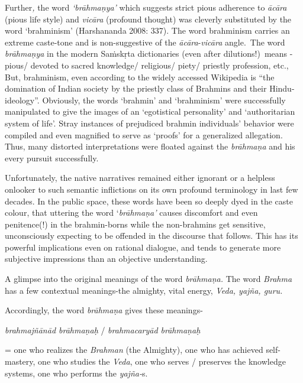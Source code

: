 Further\textit{,} the word\textit{ ‘brāhmaṇya’} which suggests strict pious adherence to \textit{ācāra} (pious life style) and \textit{vicāra} (profound thought) was cleverly substituted by the word ‘brahminism’ (Harshananda 2008: 337). The word brahminism carries an extreme caste-tone and is non-suggestive of the \textit{ācāra}-\textit{vicāra} angle.~The word \textit{brāhmaṇya} in the modern Saṁskṛta dictionaries (even after dilutions!)~means - pious/ devoted to sacred knowledge/ religious/ piety/ priestly profession, etc., But, brahminism, even according to the widely accessed Wikipedia is “the domination of Indian society by the priestly class of Brahmins and their Hindu-ideology”. Obviously, the words ‘brahmin’ and ‘brahminism’ were successfully manipulated to give the images of an ‘egotistical personality’ and ‘authoritarian system of life’. Stray instances of prejudiced brahmin individuals’ behavior were compiled and even magnified to serve as ‘proofs’ for a generalized allegation. Thus, many distorted interpretations were floated against the \textit{brāhmaṇa} and his every pursuit successfully.

Unfortunately, the native narratives remained either ignorant or a helpless onlooker to such semantic inflictions on its own profound terminology in last few decades. In the public space, these words have been so deeply dyed in the caste colour, that uttering the word ‘\textit{brāhmaṇa’} causes discomfort and even penitence(!) in the brahmin-borns while the non-brahmins get sensitive, unconsciously expecting to be offended in the discourse that follows. This has its powerful implications even on rational dialogue, and tends to generate more subjective impressions than an objective understanding.

A glimpse into the original meanings of the word \textit{brāhmaṇa.} The word \textit{Brahma} has a few contextual meanings-the almighty, vital energy, \textit{Veda, yajña, guru.}

Accordingly, the word \textit{brāhmaṇa} gives these meanings-

\textit{brahmajñānād brāhmaṇaḥ} / \textit{brahmacaryād brāhmaṇaḥ}

= one who realizes the \textit{Brahman} (the Almighty), one who has achieved self-mastery, one who studies the \textit{Veda}, one who serves / preserves the knowledge systems, one who performs the \textit{yajña-}s.

